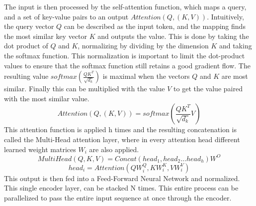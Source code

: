 The input is then processed by the self-attention function, which maps a query, and a set of key-value pairs to an output \( \mathit{Attention}(Q,(K,V))\). Intuitively, the query vector \(Q\) can be described as the input token, and the mapping finds the most similar key vector \(K\) and outputs the value. This is done by taking the dot product of \(Q\) and \(K\), normalizing by dividing by the dimension \(K\) and taking the softmax function. This normalization is important to limit the dot-product values to ensure that the softmax function still retains a good gradient flow. The resulting value \( \mathit{softmax}(\frac{QK^T}{\sqrt{d_k}})\) is maximal when the vectors \(Q\) and \(K\) are most similar. Finally this can be multiplied with the value \(V\) to get the value paired with the most similar value.
\[ \mathit{Attention}(Q,(K,V)) = \mathit{softmax}(\frac{QK^T}{\sqrt{d_k}}V)\]
This attention function is applied h times and the resulting concatenation is called the Multi-Head attention layer, where in every attention head different learned weight matrices \(W_i\) are also applied. 
\[ \mathit{MultiHead}(Q,K,V) =  \mathit{Concat}(head_1, head_2 ... head_h) W^O\]
\[  \mathit{head}_i =  \mathit{Attention}(QW^Q_i,KW^K_i,VW^V_i)\] This output is then fed into a Feed-Forward Neural Network and normalized. This single encoder layer, can be stacked N times. This entire process can be parallelized to pass the entire input sequence at once through the encoder. 

